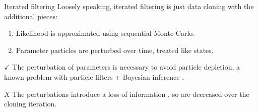 \documentclass[aspectratio=169]{beamer}\usepackage[]{graphicx}\usepackage[]{xcolor}
\begin{document}
\begin{frame}{Iterated filtering}
  Loosely speaking, iterated filtering is just data cloning with the additional pieces: 
  \begin{enumerate}
    \item Likelihood is approximated using sequential Monte Carlo. 
    \item Parameter particles are perturbed over time, treated like states.
  \end{enumerate}\pause
  {\color{green} $\checkmark$} The perturbation of parameters is necessary to avoid particle depletion, a known problem with particle filters + Bayesian inference \citep{chen24}.
  
  {\color{red} $X$} The perturbations introduce a loss of information \citep{liu01}, so are decreased over the cloning iteration.
\end{frame}
\end{document}
